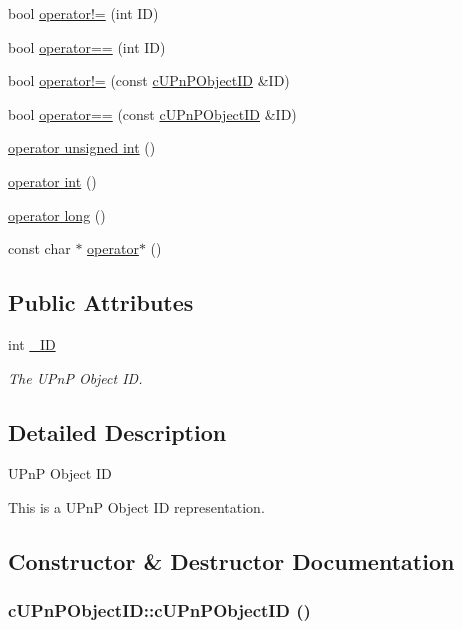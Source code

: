 \begin{CompactItemize}
\item 
bool \hyperlink{structcUPnPObjectID_5183bfe859555d90c7bc7abd576d0980}{operator!=} (int ID)
\item 
bool \hyperlink{structcUPnPObjectID_18cf7d50a8ae1b6d2034e88fef78e23f}{operator==} (int ID)
\item 
bool \hyperlink{structcUPnPObjectID_d55b5dc94c58d56762c602de5dd99790}{operator!=} (const \hyperlink{structcUPnPObjectID}{cUPnPObjectID} \&ID)
\item 
bool \hyperlink{structcUPnPObjectID_54cb3e4ab1b340c9580e915dbf9319a1}{operator==} (const \hyperlink{structcUPnPObjectID}{cUPnPObjectID} \&ID)
\item 
\hyperlink{structcUPnPObjectID_daa4eae524c68f1f85b8d82d16568d10}{operator unsigned int} ()
\item 
\hyperlink{structcUPnPObjectID_73ff8d0e18486552dbfbf828a2e7bc7c}{operator int} ()
\item 
\hyperlink{structcUPnPObjectID_d5659a7a9f7cfc7dd6ae0911ebd5e03c}{operator long} ()
\item 
const char $\ast$ \hyperlink{structcUPnPObjectID_33e67c6f297892763b5a4a41cd435490}{operator$\ast$} ()
\end{CompactItemize}
\subsection*{Public Attributes}
\begin{CompactItemize}
\item 
\hypertarget{structcUPnPObjectID_af52b7865459a66369101b7fba35aa0c}{
int \hyperlink{structcUPnPObjectID_af52b7865459a66369101b7fba35aa0c}{\_\-ID}}
\label{structcUPnPObjectID_af52b7865459a66369101b7fba35aa0c}

\begin{CompactList}\small\item\em The UPnP Object ID. \item\end{CompactList}\end{CompactItemize}


\subsection{Detailed Description}
UPnP Object ID

This is a UPnP Object ID representation. 

\subsection{Constructor \& Destructor Documentation}
\hypertarget{structcUPnPObjectID_c2ee8d12b2b317fa430e9107f1870efe}{
\subsubsection[{cUPnPObjectID}]{\setlength{\rightskip}{0pt plus 5cm}cUPnPObjectID::cUPnPObjectID ()}}
\label{structcUPnPObjectID_c2ee8d12b2b317fa430e9107f1870efe}


